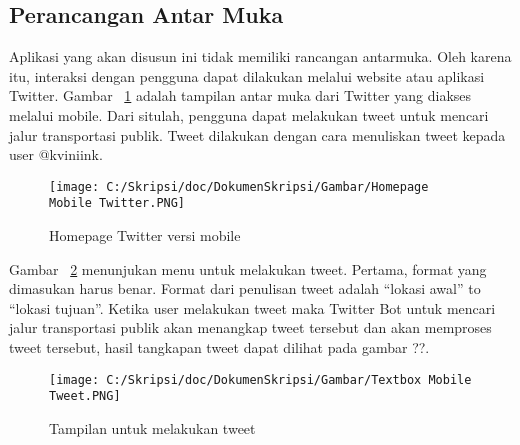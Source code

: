 \subsection{Perancangan Antar Muka}
Aplikasi yang akan disusun ini tidak memiliki rancangan antarmuka. Oleh karena itu, interaksi dengan pengguna dapat dilakukan melalui website atau aplikasi Twitter. Gambar ~\ref{fig:Homepage Mobile Twitter} adalah tampilan antar muka dari Twitter yang diakses melalui mobile. Dari situlah, pengguna dapat melakukan tweet untuk mencari jalur transportasi publik. Tweet dilakukan dengan cara menuliskan tweet kepada user @kviniink.

\begin{figure}[htbp]
	\centering
		\texttt{[image: C:/Skripsi/doc/DokumenSkripsi/Gambar/Homepage Mobile Twitter.PNG]}
	\caption{Homepage Twitter versi mobile}
	\label{fig:Homepage Mobile Twitter}
\end{figure}

Gambar ~\ref{fig:Textbox Mobile Tweet} menunjukan menu untuk melakukan tweet. Pertama, format yang dimasukan harus benar. Format dari penulisan tweet adalah "`lokasi awal"' to "`lokasi tujuan"'. Ketika user melakukan tweet maka Twitter Bot untuk mencari jalur transportasi publik akan menangkap tweet tersebut dan akan memproses tweet tersebut, hasil tangkapan tweet dapat dilihat pada gambar ??.

\begin{figure}[hp]
	\centering
		\texttt{[image: C:/Skripsi/doc/DokumenSkripsi/Gambar/Textbox Mobile Tweet.PNG]}
	\caption{Tampilan untuk melakukan tweet}
	\label{fig:Textbox Mobile Tweet}
\end{figure}





